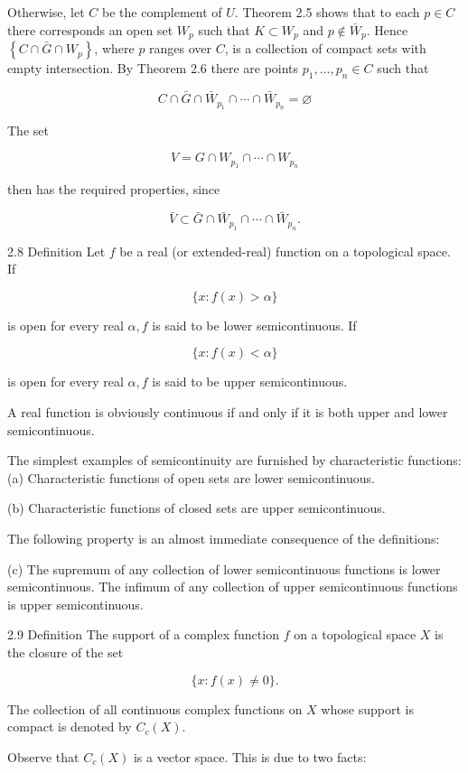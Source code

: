 \documentclass[10pt]{article}
\begin{document}
Otherwise, let $C$ be the complement of $U$. Theorem 2.5 shows that to each $p \in C$ there corresponds an open set $W_{p}$ such that $K \subset W_{p}$ and $p \notin \bar{W}_{p}$. Hence $\left\{C \cap \bar{G} \cap W_{p}\right\}$, where $p$ ranges over $C$, is a collection of compact sets with empty intersection. By Theorem 2.6 there are points $p_{1}, \ldots, p_{n} \in C$ such that

$$
C \cap \bar{G} \cap \bar{W}_{p_{1}} \cap \cdots \cap \bar{W}_{p_{n}}=\varnothing
$$

The set

$$
V=G \cap W_{p_{1}} \cap \cdots \cap W_{p_{n}}
$$

then has the required properties, since

$$
\bar{V} \subset \bar{G} \cap \bar{W}_{p_{1}} \cap \cdots \cap \bar{W}_{p_{n}} .
$$

2.8 Definition Let $f$ be a real (or extended-real) function on a topological space. If

$$
\{x: f(x)>\alpha\}
$$

is open for every real $\alpha, f$ is said to be lower semicontinuous. If

$$
\{x: f(x)<\alpha\}
$$

is open for every real $\alpha, f$ is said to be upper semicontinuous.

A real function is obviously continuous if and only if it is both upper and lower semicontinuous.

The simplest examples of semicontinuity are furnished by characteristic functions:
(a) Characteristic functions of open sets are lower semicontinuous.

(b) Characteristic functions of closed sets are upper semicontinuous.

The following property is an almost immediate consequence of the definitions:

(c) The supremum of any collection of lower semicontinuous functions is lower semicontinuous. The infimum of any collection of upper semicontinuous functions is upper semicontinuous.

2.9 Definition The support of a complex function $f$ on a topological space $X$ is the closure of the set

$$
\{x: f(x) \neq 0\} .
$$

The collection of all continuous complex functions on $X$ whose support is compact is denoted by $C_{c}(X)$.

Observe that $C_{c}(X)$ is a vector space. This is due to two facts:
\end{document}
